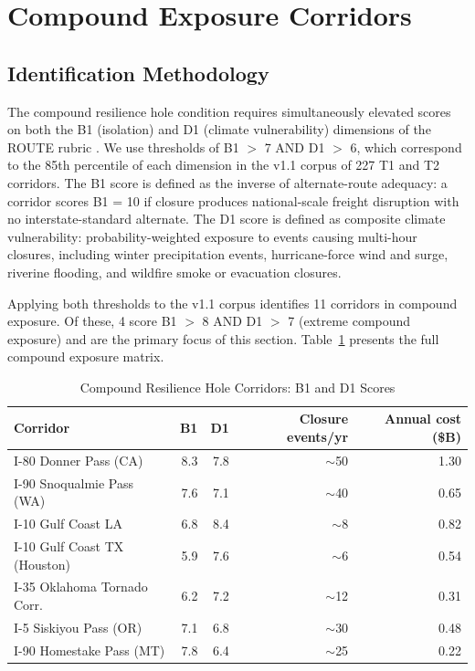 \section{Compound Exposure Corridors}
\label{sec:compound-exposure}

\subsection{Identification Methodology}

The compound resilience hole condition requires simultaneously elevated scores on both the B1 (isolation) and D1 (climate vulnerability) dimensions of the ROUTE rubric \citep{ROUTE_A2}. We use thresholds of B1 $>$ 7 AND D1 $>$ 6, which correspond to the 85th percentile of each dimension in the v1.1 corpus of 227 T1 and T2 corridors. The B1 score is defined as the inverse of alternate-route adequacy: a corridor scores B1 = 10 if closure produces national-scale freight disruption with no interstate-standard alternate. The D1 score is defined as composite climate vulnerability: probability-weighted exposure to events causing multi-hour closures, including winter precipitation events, hurricane-force wind and surge, riverine flooding, and wildfire smoke or evacuation closures.

Applying both thresholds to the v1.1 corpus identifies 11 corridors in compound exposure. Of these, 4 score B1 $>$ 8 AND D1 $>$ 7 (extreme compound exposure) and are the primary focus of this section. Table~\ref{tab:compound} presents the full compound exposure matrix.

\begin{table}[h!]
\centering
\caption{Compound Resilience Hole Corridors: B1 and D1 Scores}
\label{tab:compound}
\begin{tabular}{lrrrr}
\toprule
\textbf{Corridor} & \textbf{B1} & \textbf{D1} & \textbf{Closure events/yr} & \textbf{Annual cost (\$B)} \\
\midrule
I-80 Donner Pass (CA)        & 8.3 & 7.8 & $\sim$50 & 1.30 \\
I-90 Snoqualmie Pass (WA)    & 7.6 & 7.1 & $\sim$40 & 0.65 \\
I-10 Gulf Coast LA           & 6.8 & 8.4 & $\sim$8  & 0.82 \\
I-10 Gulf Coast TX (Houston) & 5.9 & 7.6 & $\sim$6  & 0.54 \\
I-35 Oklahoma Tornado Corr.  & 6.2 & 7.2 & $\sim$12 & 0.31 \\
I-5 Siskiyou Pass (OR)       & 7.1 & 6.8 & $\sim$30 & 0.48 \\
I-90 Homestake Pass (MT)     & 7.8 & 6.4 & $\sim$25 & 0.22 \\
\bottomrule
\end{tabular}
\end{table}

